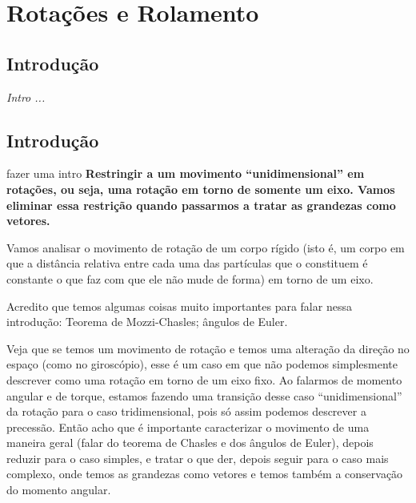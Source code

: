 \chapter{Rotações e Rolamento}\label{Chap:Rotacoes}



\section{Introdução}

{\it
Intro ...
}

\section{Introdução}

fazer uma intro
\textbf{Restringir a um movimento ``unidimensional'' em rotações, ou seja, uma rotação em torno de somente um eixo. Vamos eliminar essa restrição quando passarmos a tratar as grandezas como vetores.}


Vamos analisar o movimento de rotação de um corpo rígido (isto é, um corpo em que a distância relativa entre cada uma das partículas que o constituem é constante o que faz com que ele não mude de forma) em torno de um eixo.

Acredito que temos algumas coisas muito importantes para falar nessa introdução: Teorema de Mozzi-Chasles; ângulos de Euler.

Veja que se temos um movimento de rotação e temos uma alteração da direção no espaço (como no giroscópio), esse é um caso em que não podemos simplesmente descrever como uma rotação em torno de um eixo fixo. Ao falarmos de momento angular e de torque, estamos fazendo uma transição desse caso ``unidimensional'' da rotação para o caso tridimensional, pois só assim podemos descrever a precessão. Então acho que é importante caracterizar o movimento de uma maneira geral (falar do teorema de Chasles e dos ângulos de Euler), depois reduzir para o caso simples, e tratar o que der, depois seguir para o caso mais complexo, onde temos as grandezas como vetores e temos também a conservação do momento angular.


